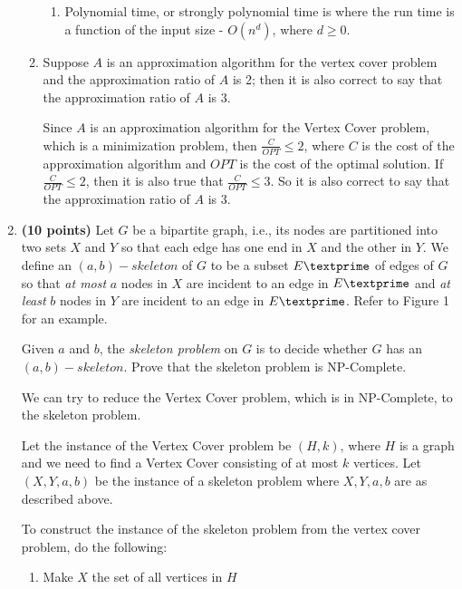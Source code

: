\documentclass[paper=a4, fontsize=11pt]{scrartcl} %
\numberwithin{figure}{section} %
\numberwithin{table}{section} %
\begin{document}
\begin{enumerate}
\begin{enumerate}
\begin{enumerate}
\item Polynomial time, or strongly polynomial time is where the run time is a function of the input size - $O(n^d)$, where $d \geq 0$. 

\end{enumerate}

\item Suppose $A$ is an approximation algorithm for the vertex cover problem and the approximation ratio of $A$ is 2; then it is also correct to say that the approximation ratio of $A$ is 3.

Since $A$ is an approximation algorithm for the Vertex Cover problem, which is a minimization problem, then $\frac{C}{OPT} \leq 2$, where $C$ is the cost of the approximation algorithm and $OPT$ is the cost of the optimal solution. If $\frac{C}{OPT} \leq 2$, then it is also true that $\frac{C}{OPT} \leq 3$. So it is also correct to say that the approximation ratio of $A$ is 3.

\end{enumerate}

\item \textbf{(10 points)} Let $G$ be a bipartite graph, i.e., its nodes are partitioned into two sets $X$ and $Y$ so that each edge has one end in $X$ and the other in $Y$. We define an $(a, b)-skeleton$ of $G$ to be a subset $E\textprime$ of edges of $G$ so that \textit{at most} $a$ nodes in $X$ are incident to an edge in $E\textprime$ and \textit{at least} $b$ nodes in $Y$ are incident to an edge in $E\textprime$. Refer to Figure 1 for an example.

Given $a$ and $b$, the \textit{skeleton problem} on $G$ is to decide whether $G$ has an $(a, b)-skeleton$. Prove that the skeleton problem is NP-Complete.

We can try to reduce the Vertex Cover problem, which is in NP-Complete, to the skeleton problem.

Let the instance of the Vertex Cover problem be $(H, k)$, where $H$ is a graph and we need to find a Vertex Cover consisting of at most $k$ vertices. Let $(X, Y, a, b)$ be the instance of a skeleton problem where $X, Y, a, b$ are as described above. 

To construct the instance of the skeleton problem from the vertex cover problem, do the following:

\begin{enumerate}

\item Make $X$ the set of all vertices in $H$


\end{enumerate}
\end{enumerate}
\end{document}
